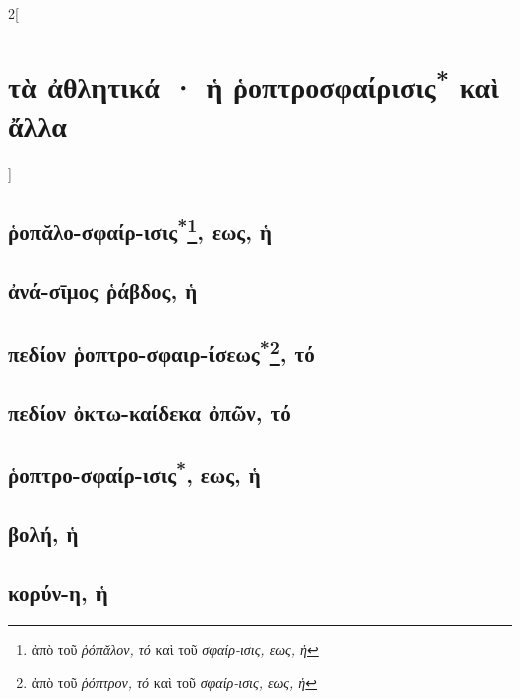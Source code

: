 \documentclass{book}
\begin{document}
\newpage  %
\begin{multicols}{2}[\section{τὰ ἀθλητικά · ἡ ῥοπτροσφαίρισις\textsuperscript{*} καὶ ἄλλα}]
\subsection{ῥοπᾰλο-σφαίρ-ισις\textsuperscript{*}\protect\footnote{ἀπὸ τοῦ \emph{ῥόπᾰλον, τό} καὶ τοῦ \emph{σφαίρ-ισις, εως, ἡ}}, εως, ἡ}
\subsection{ἀνά-σῑμος ῥάβδος, ἡ}
\subsection{πεδίον ῥοπτρο-σφαιρ-ίσεως\textsuperscript{*}\protect\footnote{ἀπὸ τοῦ \emph{ῥόπτρον, τό} καὶ τοῦ \emph{σφαίρ-ισις, εως, ἡ}}, τό}
\subsection{πεδίον ὀκτω-καίδεκα ὀπῶν, τό}
\subsection{ῥοπτρο-σφαίρ-ισις\textsuperscript{*\number\value{footnote}}, εως, ἡ}
\subsection{βολή, ἡ}
\subsection{κορύν-η, ἡ}

\end{multicols}
\end{document}
